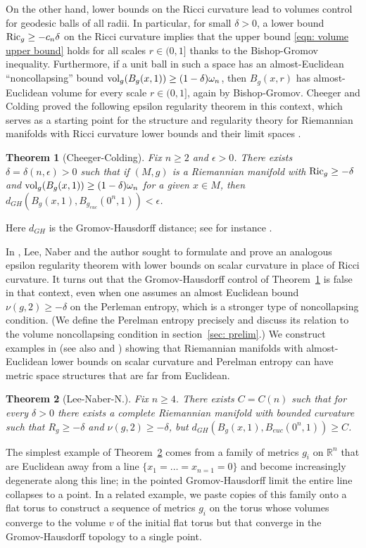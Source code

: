 \documentclass[11pt,reqno]{amsart}
\newtheorem{theorem}{Theorem}[section]
\theoremstyle{remark}
\theoremstyle{definition}
\numberwithin{equation}{section}
\newcommand{\R}{{\mathbb{R}}}
\newcommand{\e}{{\epsilon}}
\newcommand{\om}{\omega}
\newcommand{\Ric}{{\rm{Ric}}}
\newcommand{\vol}{{\rm{vol}}}
\begin{document}
On the other hand, lower bounds on the Ricci curvature lead to volumes control for geodesic balls of all radii. In particular, for small $\delta>0$,  a lower bound $\Ric_g \geq -c_n\delta$ on the Ricci curvature  implies that  the upper bound \eqref{eqn: volume upper bound} holds for all scales $r \in (0,1]$ thanks to the Bishop-Gromov inequality. 
Furthermore, if a unit ball in such a space has an almost-Euclidean   ``noncollapsing''  bound  $\vol_g(B_g(x,1)) \geq (1-\delta)\omega_n$, then $B_g(x,r)$ has almost-Euclidean volume for every scale $r \in (0,1]$, again by Bishop-Gromov.  Cheeger and Colding \cite{Colding1,CC1} proved the following epsilon regularity theorem in this context, which serves as a starting point for the structure and regularity theory for Riemannian manifolds with Ricci curvature lower bounds and their limit spaces \cite{CC1, CC2, CC3, CCannals, CN, CNJ}.
\begin{theorem}[Cheeger-Colding]\label{thm: CC}
	Fix $n\geq 2$ and $\e>0$. There exists $\delta=\delta(n,\e)>0$ such that if $(M,g)$ is a Riemannian manifold with $\Ric_g \geq -\delta$ and $\vol_g(B_g(x,1))\geq (1-\delta) \om_n$ for a given $x \in M$, then $d_{GH}(B_{g}(x,1) , B_{g_{euc}}(0^n, 1) )<\e$.
\end{theorem}
Here $d_{GH}$ is the Gromov-Hausdorff distance; see for instance \cite[Chapter 10]{petersenBook}.

In \cite{LNN1}, Lee, Naber and the author sought to formulate and prove an analogous epsilon regularity theorem with lower bounds on scalar curvature in place of Ricci curvature. 
It turns out that the Gromov-Hausdorff control of Theorem~\ref{thm: CC} is false in that context, even when one assumes an almost Euclidean bound $\nu(g, 2)\geq -\delta$ on the Perleman entropy, which is a stronger type of noncollapsing condition. (We define the Perelman entropy precisely and discuss its relation to the volume noncollapsing condition in section~\ref{sec: prelim}.) We construct examples in \cite{LNN1} (see also \cite{LNNSurvey} and \cite{LeeTopping}) showing that Riemannian manifolds with almost-Euclidean lower bounds on scalar curvature and Perelman entropy can have metric space structures that are far from Euclidean.
\begin{theorem}[Lee-Naber-N.]\label{thm: example}
	Fix $n \geq 4$. There exists $C=C(n)$ such that for every $\delta>0$ there exists a complete Riemannian manifold with bounded curvature such that $R_g \geq -\delta$ and $\nu(g, 2)\geq -\delta$, but $d_{GH}(B_g(x,1), B_{euc}(0^n, 1)) \geq C$.
\end{theorem}
 The simplest example of  Theorem~\ref{thm: example} comes from  a family of metrics $g_i$ on $\R^n$ that are Euclidean away from a line $\{ x_1=\dots=x_{n=1} =0\}$ and become increasingly degenerate along this line; in the pointed Gromov-Hausdorff limit the entire line collapses to a point.
 In a related example, we paste copies of this family onto a flat torus to construct a sequence of metrics $g_i$ on the torus whose volumes converge to the volume $v$ of the initial flat torus but that converge in the Gromov-Hausdorff topology to a single point.
 
\end{document}
